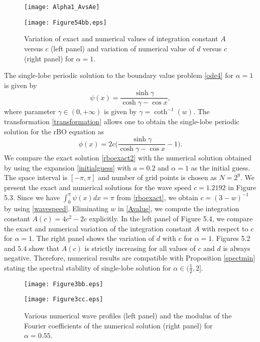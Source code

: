 \documentclass[12pt,reqno]{amsart}
\newcommand{\2}{L^2_{per}(0, T)}
\numberwithin{equation}{section}
\numberwithin{figure}{section}
\begin{document}
\begin{figure}[h]
\begin{minipage}[t]{0.49\linewidth}
   \texttt{[image: Alpha1\_AvsAe]}%
 \end{minipage}
  \begin{minipage}[t]{0.49\linewidth}
   \texttt{[image: Figure54bb.eps]}
 \end{minipage}
 \caption{Variation of exact and numerical values of  integration constant $A$ versus $c$ (left panel) and variation of numerical value of $d$ versus $c$ (right panel) for  $\alpha=1$.}
\end{figure}

\noindent
The single-lobe periodic solution to the boundary value problem
\eqref{ode4} for $\alpha=1$ is given by
\begin{equation}\label{rboexact}
\psi (x)= \frac{\sinh \gamma}{ \cosh \gamma -\cos x},
\end{equation}
where  parameter $\gamma\in(0,+\infty)$ is given by $\gamma=\coth^{-1}(w)$.
The transformation \eqref{transformation} allows one to obtain the single-lobe periodic solution for the rBO equation as
\begin{equation} \label{rboexact2}
\phi(x)=2c \bigg( \frac{\sinh \gamma}{ \cosh \gamma -\cos x} -1 \bigg).
\end{equation}
We compare the exact solution \eqref{rboexact2} with the numerical solution obtained by using the expansion \eqref{initialguess} with $a=0.2$ and $\alpha=1$ as the initial guess. The space interval is $ [-\pi,\pi] $ and number of grid points is chosen as $N=2^9$. We present the exact and numerical solutions for the wave speed $c=1.2192$ in Figure 5.3. Since we have $\int_0^{\pi} \psi(x) dx= \pi$ from \eqref{rboexact}, we obtain  $c=(3-w)^{-1}$ by using \eqref{wavespeed}. Eliminating $w$ in \eqref{Avalue}, we compute the integration constant $A(c)=4c^2-2c$ explicitly.  In the left panel of Figure 5.4, we compare the
exact and numerical variation of the integration constant $A$ with respect to $c$
for $\alpha=1$. The right panel shows the variation of  $d$  with $c$ for $\alpha=1$.
 Figures 5.2 and $5.4$  show that $A(c)$ is strictly increasing for all values of $c$ and $d$ is always negative. Therefore, numerical results are compatible with Proposition  \ref{spectmin} stating the spectral stability of single-lobe solution for $\alpha\in (\frac{1}{2},2]$.
\begin{figure}[!htbp]
\begin{minipage}[t]{0.49\linewidth}
   \texttt{[image: Figure3bb.eps]}
 \end{minipage}
  \begin{minipage}[t]{0.49\linewidth}
   \texttt{[image: Figure3cc.eps]}
 \end{minipage}
 \caption{ Various numerical wave profiles  (left panel) and the modulus of the Fourier coefficients of the numerical solution (right panel) for   $\alpha=0.55$.}
\end{figure}
\end{document}

